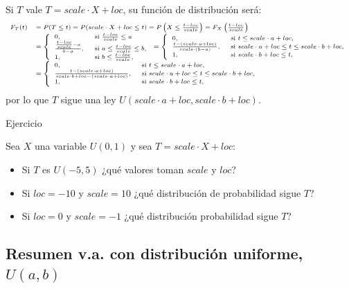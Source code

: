 \documentclass[
  letterpaper,
  DIV=11,
  numbers=noendperiod]{scrreprt}
\begin{document}
Si \(T\) vale \(T=scale\cdot X+loc\), su función de distribución será:
\[
\scriptsize
\begin{array}{rl}
F_T(t)&=P(T\leq t)= P(scale\cdot X+ loc\leq t)= P\left(X\leq \frac{t-loc}{scale}\right)=F_X\left(\frac{t-loc}{scale}\right)\\
&=
\left\{\begin{array}{ll} 0, & \mbox{ si } \frac{t-loc}{scale}\leq a\\\frac{\frac{t-loc}{scale}-a}{b-a}, & \mbox{ si } a\leq \frac{t-loc}{scale}\leq b,\\1, & \mbox{ si } b\leq \frac{t-loc}{scale},\end{array}\right.=
\left\{\begin{array}{ll} 0, & \mbox{ si } t\leq scale\cdot a +loc, \\
\frac{t-(scale\cdot a+loc)}{scale\cdot (b-a)}, & \mbox{ si } scale\cdot a+loc \leq t\leq scale\cdot b+loc, \\
1, & \mbox{ si } scale\cdot b+loc\leq t, \end{array}\right.\\
& = 
\left\{\begin{array}{ll} 0, & \mbox{ si } t\leq scale\cdot a +loc, \\
\frac{t-(scale\cdot a+loc)}{scale\cdot b+loc-(scale\cdot a+loc)}, & \mbox{ si } scale\cdot a+loc \leq t\leq scale\cdot b+loc, \\
1, & \mbox{ si } scale\cdot b+loc\leq t,\end{array}\right.
\end{array}
\] por lo que \(T\) sigue una ley
\(U(scale\cdot a +loc,scale\cdot b +loc)\).

\begin{Ejercicio}{Ejercicio}{}

Sea \(X\) una variable \(U(0,1)\) y sea \(T=scale\cdot X+loc\):

\begin{itemize}
\item
  Si \(T\) es \(U(-5,5)\) ¿qué valores toman \(scale\) y \(loc\)?
\item
  Si \(loc=-10\) y \(scale=10\) ¿qué distribución de probabilidad sigue
  \(T\)?
\item
  Si \(loc=0\) y \(scale=-1\) ¿qué distribución probabilidad sigue
  \(T\)?
\end{itemize}

\end{Ejercicio}

\subsection{\texorpdfstring{Resumen v.a. con distribución uniforme,
\(U(a,b)\)}{Resumen v.a. con distribución uniforme, U(a,b)}}\label{resumen-v.a.-con-distribuciuxf3n-uniforme-uab}
\end{document}
